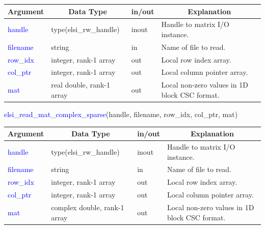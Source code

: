 \documentclass{report}
\begin{document}
\begin{tabular}[]{|p{20mm}|p{45mm}|p{15mm}|p{85mm}|}
\hline
\multicolumn{1}{|c|}{\textbf{Argument}} & \multicolumn{1}{c|}{\textbf{Data Type}} & \multicolumn{1}{c|}{\textbf{in/out}} & \multicolumn{1}{c|}{\textbf{Explanation}}\\
\hline
\textcolor{blue}{handle}   & type(elsi\_rw\_handle)    & inout & Handle to matrix I/O instance.\\
\hline
\textcolor{blue}{filename} & string                    & in    & Name of file to read.\\
\hline
\textcolor{blue}{row\_idx} & integer, rank-1 array     & out   & Local row index array.\\
\hline
\textcolor{blue}{col\_ptr} & integer, rank-1 array     & out   & Local column pointer array.\\
\hline
\textcolor{blue}{mat}      & real double, rank-1 array & out   & Local non-zero values in 1D block CSC format.\\
\hline
\end{tabular}

\begin{labeling}{\hspace{6cm}}
\item [\hspace{0.3cm} \textcolor{blue}{elsi\_read\_mat\_complex\_sparse}(handle, filename, row\_idx, col\_ptr, mat)]
\end{labeling}

\begin{tabular}[]{|p{20mm}|p{45mm}|p{15mm}|p{85mm}|}
\hline
\multicolumn{1}{|c|}{\textbf{Argument}} & \multicolumn{1}{c|}{\textbf{Data Type}} & \multicolumn{1}{c|}{\textbf{in/out}} & \multicolumn{1}{c|}{\textbf{Explanation}}\\
\hline
\textcolor{blue}{handle}   & type(elsi\_rw\_handle)       & inout & Handle to matrix I/O instance.\\
\hline
\textcolor{blue}{filename} & string                       & in    & Name of file to read.\\
\hline
\textcolor{blue}{row\_idx} & integer, rank-1 array        & out   & Local row index array.\\
\hline
\textcolor{blue}{col\_ptr} & integer, rank-1 array        & out   & Local column pointer array.\\
\hline
\textcolor{blue}{mat}      & complex double, rank-1 array & out   & Local non-zero values in 1D block CSC format.\\
\hline
\end{tabular}
\end{document}
